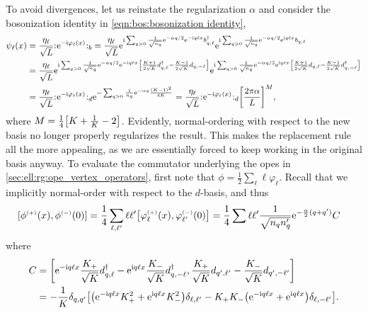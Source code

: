 To avoid divergences, let us reinstate the regularization $\alpha$ and consider the bosonization identity in \autoref{eqn:bos:bosonization identity},
\begin{align*}
\psi_\ell(x) &= \frac{\eta_\ell}{\sqrt{L}} \normord{\powe{-\i\varphi_\ell(x)}}_b = \frac{\eta_\ell}{\sqrt{L}} \powe{\i\sum_{q>0} \frac{1}{\sqrt{n_q}} \powe{-\alpha q/2} \powe{-\i q\ell x} b_{q,\ell}^\dagger} \powe{\i\sum_{q>0} \frac{1}{\sqrt{n_q}} \powe{-\alpha q/2} \powe{\i q\ell x} b_{q,\ell}}\\
&= \frac{\eta_\ell}{\sqrt{L}} \powe{\i\sum_{q>0} \frac{1}{\sqrt{n_q}} \powe{-\alpha q/2} \powe{-\i q\ell x} \klb*{\frac{K+1}{2\sqrt{K}} d_{q,\ell}^\dagger - \frac{K-1}{2\sqrt{K}} d_{q,-\ell}} } \powe{\i\sum_{q>0} \frac{1}{\sqrt{n_q}} \powe{-\alpha q/2} \powe{\i q\ell x} \klb*{\frac{K+1}{2\sqrt{K}} d_{q,\ell} - \frac{K-1}{2\sqrt{K}} d_{q,-\ell}^\dagger} }\\
&= \frac{\eta_\ell}{\sqrt{L}} \normord{\powe{-\i\varphi_\ell(x)}}_d \powe{-\sum_{q>0} \frac{1}{n_q} \powe{-\alpha q} \frac{(K-1)^2}{4K}} = \frac{\eta_\ell}{\sqrt{L}} \normord{\powe{-\i\varphi_\ell(x)}}_d \klb*{\frac{2\pi\alpha}{L}}^M,
\end{align*}
where $M=\frac{1}{4} \klb*{K + \frac{1}{K} - 2}$.
Evidently, normal-ordering with respect to the new basis no longer properly regularizes the result.
This makes the replacement rule all the more appealing, as we are essentially forced to keep working in the original basis anyway.
To evaluate the commutator underlying the \glspl{ope} in \autoref{sec:ell:rg:ope_vertex_operators}, first note that $\phi = \frac{1}{2} \sum_\ell \ell \varphi_\ell$.
Recall that we implicitly normal-order with respect to the $d$-basis, and thus
\begin{align*}
\klb*{\phi\eplus(x), \phi\eminus(0)} &= \frac{1}{4} \sum_{\ell,\ell'} \ell \ell' \klb*{\varphi_\ell\eplus(x), \varphi_{\ell'}\eminus (0)} = \frac{1}{4} \sum \ell \ell' \frac{1}{\sqrt{n_qn_q'}} \powe{-\frac{\alpha}{2}(q+q')} C
\end{align*}
where
\begin{align*}
C&=\klb*{\powe{-\i q\ell x} \frac{K_+}{\sqrt{K}} d_{q,\ell}^\dagger - \powe{\i q\ell x} \frac{K_-}{\sqrt{K}} d_{q,-\ell}^\dagger, \frac{K_+}{\sqrt{K}} d_{q',\ell'}- \frac{K_-}{\sqrt{K}} d_{q',-\ell'}}\\
&= -\frac{1}{K} \delta_{q,q'} \klb*{ \kla*{\powe{-\i q\ell x} K_+^2 + \powe{\i q\ell x} K_-^2} \delta_{\ell,\ell'} - K_+K_- \kla*{\powe{-\i q\ell x} + \powe{\i q\ell x}} \delta_{\ell,-\ell'}}.
\end{align*}
